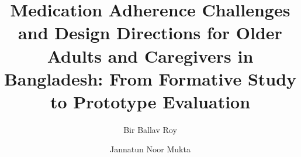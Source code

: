 \documentclass[acmlarge]{acmart}
\begin{document}
% 
\title{Medication Adherence Challenges and Design Directions for Older Adults and Caregivers in Bangladesh: From Formative Study to Prototype Evaluation}


\author{Bir Ballav Roy}
\authornotemark[1]







\author{Jannatun Noor Mukta}

\renewcommand{\shortauthors}{Trovato et al.}

\end{document}
